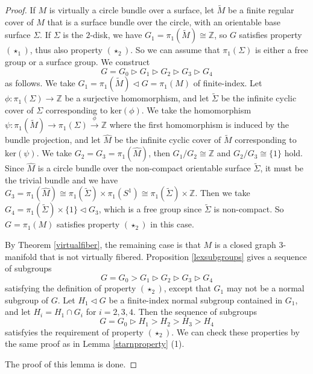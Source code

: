 \documentclass{amsart}
\numberwithin{equation}{section}
\theoremstyle{definition}
\begin{document}
\begin{proof}
If $M$ is virtually a circle bundle over a surface, let $\tilde{M}$ be a finite regular cover of $M$ that is a surface bundle over the circle, with an orientable base surface $\Sigma$. If $\Sigma$ is the $2$-disk, we have $G_1=\pi_1(\tilde{M})\cong \mathbb{Z}$, so $G$ satisfies property $(\star_1)$, thus also property $(\star_2)$. So we can assume that $\pi_1(\Sigma)$ is either a free group or a surface group. We construct
$$G=G_0\vartriangleright G_1\vartriangleright G_2\vartriangleright G_3\vartriangleright G_4$$ 
as follows.
We take $G_1=\pi_1(\tilde{M}) \vartriangleleft G=\pi_1(M)$ of finite-index. Let $\phi:\pi_1(\Sigma)\to \mathbb{Z}$ be a surjective homomorphism, and let $\tilde{\Sigma}$ be the infinite cyclic cover of $\Sigma$ corresponding to $\text{ker}(\phi)$. We take the homomorphism $\psi:\pi_1(\tilde{M})\to \pi_1(\Sigma)\xrightarrow{\phi}\mathbb{Z}$ where the first homomorphism is induced by the bundle projection, and let $\hat{M}$ be the infinite cyclic cover of $\tilde{M}$ corresponding to $\text{ker}(\psi)$. We take $G_2=G_3=\pi_1(\hat{M})$,  then $G_1/G_2\cong \mathbb{Z}$ and $G_2/G_3\cong \{1\}$ hold. Since $\hat{M}$ is a circle bundle over the non-compact orientable surface $\tilde{\Sigma}$, it must be the trivial bundle and we have $G_3=\pi_1(\hat{M})\cong \pi_1(\tilde{\Sigma})\times \pi_1(S^1)\cong \pi_1(\tilde{\Sigma})\times \mathbb{Z}$. Then we take $G_4=\pi_1(\tilde{\Sigma})\times \{1\} \vartriangleleft G_3$, which is a free group since $\tilde{\Sigma}$ is non-compact. So $G=\pi_1(M)$ satisfies property $(\star_2)$ in this case.


By Theorem \ref{virtualfiber}, the remaining case is that $M$ is a closed graph $3$-manifold that is not virtually fibered. Proposition \ref{lexsubgroups} gives a sequence of subgroups 
$$G=G_0>G_1\vartriangleright G_2\vartriangleright G_3\vartriangleright G_4$$ 
satisfying the definition of property $(\star_2)$, except that $G_1$ may not be a normal subgroup of $G$. Let $H_1\vartriangleleft G$ be a finite-index normal subgroup contained in $G_1$, and let $H_i=H_1\cap G_i$ for $i=2,3,4$. Then the sequence of subgroups $$G=G_0\vartriangleright H_1>H_2>H_3>H_4$$ 
satisfyies the requirement of property $(\star_2)$. We can check these properties by the same proof as in Lemma \ref{starnproperty} (1). 

The proof of this lemma is done.
\end{proof}
\end{document}
